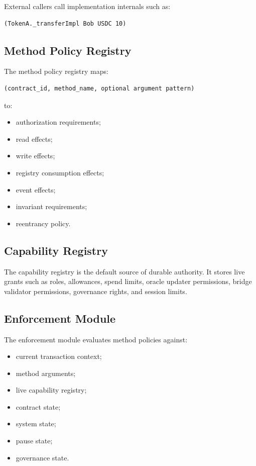 External callers \MUSTNOT{} call implementation internals such as:

\begin{lstlisting}
(TokenA._transferImpl Bob USDC 10)
\end{lstlisting}

\subsection{Method Policy Registry}

The method policy registry maps:

\begin{lstlisting}
(contract_id, method_name, optional argument pattern)
\end{lstlisting}

to:

\begin{itemize}
  \item authorization requirements;
  \item read effects;
  \item write effects;
  \item registry consumption effects;
  \item event effects;
  \item invariant requirements;
  \item reentrancy policy.
\end{itemize}

\subsection{Capability Registry}

The capability registry is the default source of durable authority. It stores live grants such as roles, allowances, spend limits, oracle updater permissions, bridge validator permissions, governance rights, and session limits.

\subsection{Enforcement Module}

The enforcement module evaluates method policies against:

\begin{itemize}
  \item current transaction context;
  \item method arguments;
  \item live capability registry;
  \item contract state;
  \item system state;
  \item pause state;
  \item governance state.
\end{itemize}

